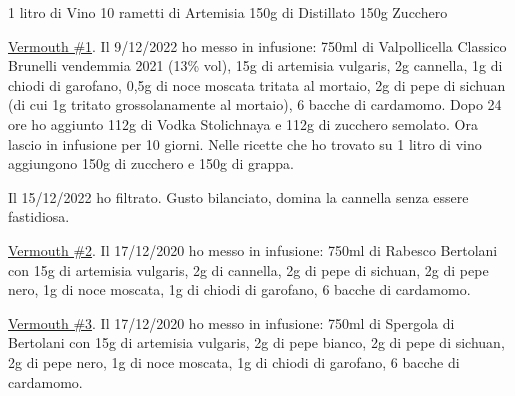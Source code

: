 \serves{-}%
\cooktime[]{-}%
\begin{ingreds}
	1 litro di Vino
	10 rametti di Artemisia
	150g di Distillato
	150g Zucchero



\end{ingreds}


\begin{method}
\underline{Vermouth \#1}. Il 9/12/2022 ho messo in infusione: 750ml di Valpollicella Classico Brunelli vendemmia 2021 (13\% vol), 15g di artemisia vulgaris, 2g cannella, 1g di chiodi di garofano, 0,5g di noce moscata tritata al mortaio, 2g di pepe di sichuan (di cui 1g tritato grossolanamente al mortaio), 6 bacche di cardamomo. Dopo 24 ore ho aggiunto 112g di Vodka Stolichnaya e 112g di zucchero semolato. Ora lascio in infusione per 10 giorni. Nelle ricette che ho trovato su 1 litro di vino aggiungono 150g di zucchero e 150g di grappa.

Il 15/12/2022 ho filtrato. Gusto bilanciato, domina la cannella senza essere fastidiosa.

\underline{Vermouth \#2}. Il 17/12/2020 ho messo in infusione: 750ml di Rabesco Bertolani con 15g di artemisia vulgaris, 2g di cannella, 2g di pepe di sichuan, 2g di pepe nero, 1g di noce moscata, 1g di chiodi di garofano, 6 bacche di cardamomo.

\underline{Vermouth \#3}. Il 17/12/2020 ho messo in infusione: 750ml di Spergola di Bertolani con 15g di artemisia vulgaris, 2g di pepe bianco, 2g di pepe di sichuan, 2g di pepe nero, 1g di noce moscata, 1g di chiodi di garofano, 6 bacche di cardamomo.



\end{method}




